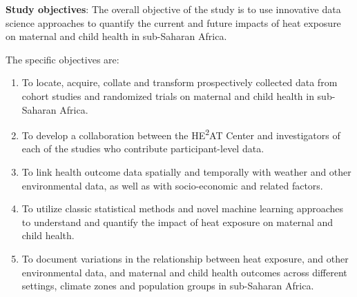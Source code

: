 \documentclass[12pt,letterpaper]{article}
\begin{document}
\textbf{Study objectives}: The overall objective of the study is to use innovative data science approaches to quantify the current and future impacts of heat exposure on maternal and child health in sub-Saharan Africa.

The specific objectives are:
\begin{enumerate}
    \item To locate, acquire, collate and transform prospectively collected data from cohort studies and randomized trials on maternal and child health in sub-Saharan Africa.
    \item To develop a collaboration between the HE\textsuperscript{2}AT Center and investigators of each of the studies who contribute participant-level data.
    \item To link health outcome data spatially and temporally with weather and other environmental data, as well as with socio-economic and related factors.
    \item To utilize classic statistical methods and novel machine learning approaches to understand and quantify the impact of heat exposure on maternal and child health.
    \item To document variations in the relationship between heat exposure, and other environmental data, and maternal and child health outcomes across different settings, climate zones and population groups in sub-Saharan Africa.
\end{enumerate}
\end{document}
